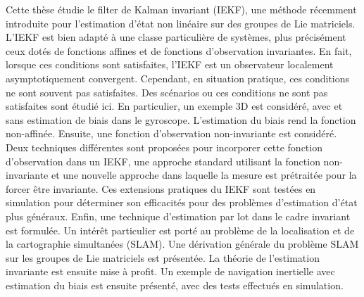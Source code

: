 Cette thèse étudie le filter de Kalman invariant (IEKF), une méthode récemment introduite pour l'estimation d'état non linéaire sur des groupes de Lie matriciels. 
L'IEKF est bien adapté à une classe particulière de systèmes, plus précisément ceux dotés de fonctions affines et de fonctions d'observation invariantes. 
En fait, lorsque ces conditions sont satisfaites, l'IEKF est un observateur localement asymptotiquement convergent. 
Cependant, en situation pratique, ces conditions ne sont souvent pas satisfaites. 
Des scénarios ou ces conditions ne sont pas satisfaites sont étudié ici. 
En particulier, un exemple 3D est considéré, avec et sans estimation de biais dans le gyroscope. 
L'estimation du biais rend la fonction  non-affinée. 
Ensuite, une fonction d'observation non-invariante est considéré. 
Deux techniques différentes sont proposées pour incorporer cette fonction d'observation dans un IEKF, une approche standard utilisant la fonction non-invariante et une nouvelle approche dans laquelle la mesure est prétraitée pour la forcer être invariante. 
Ces extensions pratiques du IEKF sont testées en simulation pour déterminer son efficacités pour des problèmes d'estimation d'état plus généraux. 
Enfin, une technique d'estimation par lot dans le cadre invariant est formulée. 
Un intérêt particulier est porté au problème de la localisation et de la cartographie simultanées (SLAM). 
Une dérivation générale du problème SLAM sur les groupes de Lie matriciels est présentée. 
La théorie de l'estimation invariante est ensuite mise à profit. 
Un exemple de navigation inertielle avec estimation du biais est ensuite présenté, avec des tests effectués en simulation.

